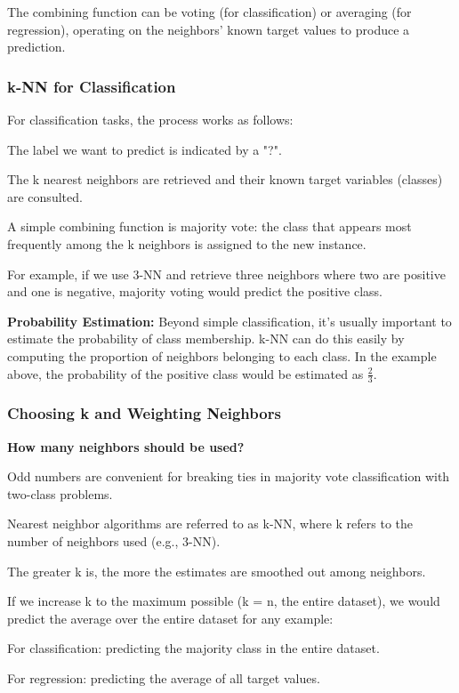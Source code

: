     The combining function can be voting (for classification) or averaging (for regression), operating on the neighbors' known target values to produce a prediction.
    
    \subsubsection{k-NN for Classification}
    
    For classification tasks, the process works as follows:
    \begin{compactitemize}
        \item The label we want to predict is indicated by a "?".
        \item The k nearest neighbors are retrieved and their known target variables (classes) are consulted.
        \item A simple combining function is majority vote: the class that appears most frequently among the k neighbors is assigned to the new instance.
    \end{compactitemize}
    
    For example, if we use 3-NN and retrieve three neighbors where two are positive and one is negative, majority voting would predict the positive class.
    
    \textbf{Probability Estimation:} Beyond simple classification, it's usually important to estimate the probability of class membership. k-NN can do this easily by computing the proportion of neighbors belonging to each class. In the example above, the probability of the positive class would be estimated as $\frac{2}{3}$.
    
    \subsubsection{Choosing k and Weighting Neighbors}
    
    \textbf{How many neighbors should be used?}
    \begin{compactitemize}
        \item Odd numbers are convenient for breaking ties in majority vote classification with two-class problems.
        \item Nearest neighbor algorithms are referred to as k-NN, where k refers to the number of neighbors used (e.g., 3-NN).
        \item The greater k is, the more the estimates are smoothed out among neighbors.
        \item If we increase k to the maximum possible (k = n, the entire dataset), we would predict the average over the entire dataset for any example:
        \begin{compactitemize}
            \item For classification: predicting the majority class in the entire dataset.
            \item For regression: predicting the average of all target values.
        \end{compactitemize}
    \end{compactitemize}
    
